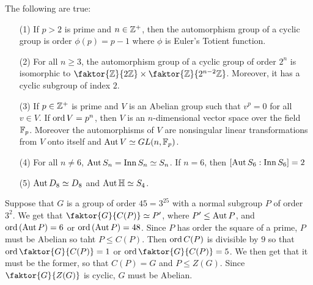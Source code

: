 \begin{theorem}\label{4.4.6}
    The following are true:
    \begin{enumerate}
        \item[(1)] If $p>2$ is prime and $n \in \mathbb{Z}^+$, then the automorphism
            group of a cyclic group is order $\phi(p)=p-1$ where $\phi$ is
            Euler's Totient function.

        \item[(2)] For all $n \geq 3$, the automorphism group of a cyclic group
            of order  $2^n$ is isomorphic to  $\faktor{\Z}{2\Z} \times
            \faktor{\Z}{2^{n-2}\Z}$. Moreover, it has a cyclic subgroup of index
            $2$.

        \item[(3)] If $p \in \mathbb{Z}^+$ is prime and $V$ is an Abelian group such
            that  $v^p=0$ for all $v \in V$. If  $\operatorname{ord}{V}=p^n$, then $V$ is an
            $n$-dimensional vector space over the field  $\mathbb{F}_p$. Moreover the
            automorphisms of $V$ are nonsingular linear transformations from $V$
            onto itself and  $\operatorname{Aut}{V} \simeq GL(n,\mathbb{F}_p)$.

        \item[(4)] For all $n \neq 6$,  $\operatorname{Aut}{S_n}=\operatorname{Inn}{S_n} \simeq S_n$. If
            $n=6$, then $[\operatorname{Aut}{S_6}:\operatorname{Inn}{S_6}]=2$

        \item[(5)] $\operatorname{Aut}{D_8} \simeq D_8$ and $\operatorname{Aut}{\mathbb{H}} \simeq S_4$.
    \end{enumerate}
\end{theorem}

\begin{example}\label{}
    Suppose that $G$ is a group of order  $45=3^25$ with a normal subgroup $P$
    of order $3^2$. We get that  $\faktor{G}{C(P)} \simeq P'$, where $P' \leq
    \operatorname{Aut}{P}$, and $\operatorname{ord}{(\operatorname{Aut}{P})}=6$ or $\operatorname{ord}{(\operatorname{Aut}{P})}=48$. Since $P$ has
    order the square of a prime,  $P$ must be Abelian so taht  $P \leq C(P)$.
    Then $\operatorname{ord}{C(P)}$ is divisible by $9$ so that $\ord {\faktor{G}{C(P)}}=1$ or
    $\ord{\faktor{G}{C(P)}}=5$. We then get that it must be the former, so that
    $C(P)=G$ and $P \leq Z(G)$. Since $\faktor{G}{Z(G)}$ is cyclic, $G$ must be
    Abelian.
\end{example}
